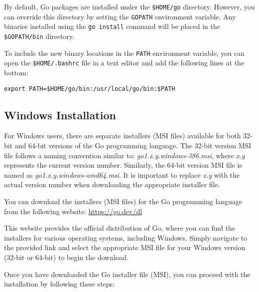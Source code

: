 By default, Go packages are installed under the \texttt{\$HOME/go} directory.
However, you can override this directory by setting the \texttt{GOPATH}
environment variable. Any binaries installed using the \texttt{go install}
command will be placed in the \texttt{\$GOPATH/bin} directory.

To include the new binary locations in the \texttt{PATH} environment variable,
you can open the \texttt{\$HOME/.bashrc} file in a text editor and add the
following lines at the bottom:

\begin{lstlisting}[numbers=none]
export PATH=$HOME/go/bin:/usr/local/go/bin:$PATH
\end{lstlisting}

\subsection{Windows Installation}

For Windows users, there are separate installers (MSI
files) available for both 32-bit and 64-bit versions of the Go programming
language. The 32-bit version MSI file follows a naming convention similar to:
\textit{go1.x.y.windows-386.msi}, where \textit{x.y} represents the current version number.
Similarly, the 64-bit version MSI file is named
as \textit{go1.x.y.windows-amd64.msi}. It is important to replace \textit{x.y}
with the actual version number when downloading the appropriate installer file.

You can download the installers (MSI files) for the Go programming language from
the following website: \url{https://go.dev/dl}

This website provides the official distribution of Go, where you can find the
installers for various operating systems, including Windows. Simply navigate to
the provided link and select the appropriate MSI file for your Windows version
(32-bit or 64-bit) to begin the download.

Once you have downloaded the Go installer file (MSI), you can proceed with the
installation by following these steps:

